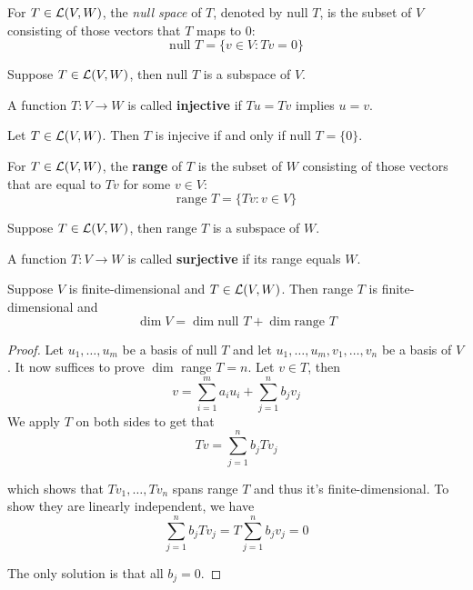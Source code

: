 \documentclass{extarticle}
\begin{document}
\begin{definition}
    For \(T \in \mathcal{L}(V, W)\), the \emph{null space} of \(T\), denoted by \(\text{null } T\), is the subset of 
    \(V\) consisting of those vectors that \(T\) maps to 0:
    \[\text{null } T = \{v \in V \colon Tv = 0\}\]
\end{definition}

\begin{corollary}
    Suppose \(T \in \mathcal{L}(V, W)\), then \(\text{null } T\) is a subspace of \(V\). 
\end{corollary}

\begin{definition}[injective]
    A function \(T \colon V \to W\) is called \textbf{injective} if \(Tu = Tv\) implies \(u = v\). 
\end{definition}

\begin{thm}
    Let \(T \in \mathcal{L}(V, W)\). Then \(T\) is injecive if and only if \(\text{null } T = \{0\}\). 
\end{thm}

\begin{definition}[range]
    For \(T \in \mathcal{L}(V, W)\), the \textbf{range} of \(T\) is the subset of \(W\) consisting of those 
    vectors that are equal to \(T v\) for some \(v \in V\):
    \[\text{range } T = \{Tv \colon v \in V\}\]
\end{definition}

\begin{corollary}
    Suppose \(T \in \mathcal{L}(V, W)\), then \(\text{range } T\) is a subspace of \(W\). 
\end{corollary}

\begin{definition}[surjective]
    A function \(T \colon V \to W\) is called \textbf{surjective} if its range equals \(W\). 
\end{definition}

\begin{thm}
    Suppose \(V\) is finite-dimensional and \(T \in \mathcal{L}(V, W)\). Then range \(T\) is finite-dimensional 
    and 
    \[\dim V = \dim \text{null } T + \dim \text{range } T\]
\end{thm}

\begin{proof}
Let \(u_1, \ldots, u_m\) be a basis of null \(T\) and let \(u_1, \ldots, u_m, v_1, \ldots, v_n\)
be a basis of \(V\). It now suffices to prove \(\dim\) range \(T = n\). Let \(v \in T\), then 
\[v = \sum_{i=1}^{m}a_i u_i + \sum_{j=1}^{n}b_j v_j\]
We apply \(T\) on both sides to get that 
\[Tv = \sum_{j=1}^{n}b_j T v_j \]

which shows that \(Tv_1, \ldots, T v_n\) spans range \(T\) and thus it's finite-dimensional. To show 
they are linearly independent, we have 
\[\sum_{j=1}^{n} b_j T v_j =  T \sum_{j=1}^{n} b_j v_j = 0\]

The only solution is that all \(b_j = 0\). 
\end{proof}
\end{document}
